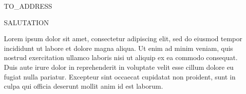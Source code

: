 \documentclass[]{letter}
\begin{document}

\begin{letter}{TO\_ADDRESS}
\address{ADDRESS}

\opening{SALUTATION}

Lorem ipsum dolor sit amet, consectetur adipiscing elit, sed do eiusmod tempor incididunt ut labore et dolore magna aliqua. 
Ut enim ad minim veniam, quis nostrud exercitation ullamco laboris nisi ut aliquip ex ea commodo consequat. 
Duis aute irure dolor in reprehenderit in voluptate velit esse cillum dolore eu fugiat nulla pariatur.
Excepteur sint occaecat cupidatat non proident, sunt in culpa qui officia deserunt mollit anim id est laborum.


\signature{Your Boss}

\closing{}


\end{letter}
\end{document}

